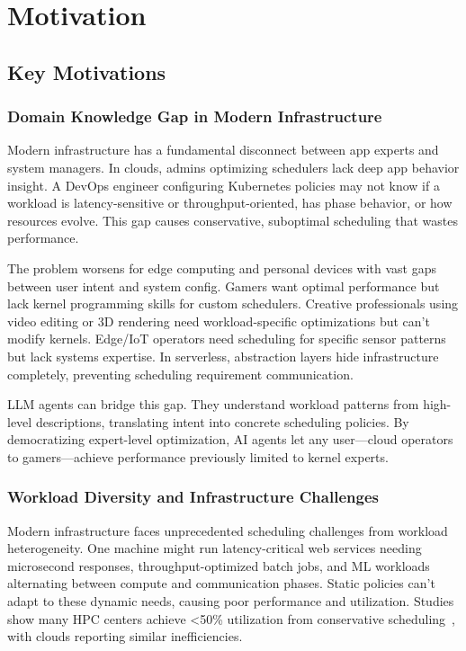 \section{Motivation}

\subsection{Key Motivations}

\subsubsection{Domain Knowledge Gap in Modern Infrastructure}

Modern infrastructure has a fundamental disconnect between app experts and system managers. In clouds, admins optimizing schedulers lack deep app behavior insight. A DevOps engineer configuring Kubernetes policies may not know if a workload is latency-sensitive or throughput-oriented, has phase behavior, or how resources evolve. This gap causes conservative, suboptimal scheduling that wastes performance.

The problem worsens for edge computing and personal devices with vast gaps between user intent and system config. Gamers want optimal performance but lack kernel programming skills for custom schedulers. Creative professionals using video editing or 3D rendering need workload-specific optimizations but can't modify kernels. Edge/IoT operators need scheduling for specific sensor patterns but lack systems expertise. In serverless, abstraction layers hide infrastructure completely, preventing scheduling requirement communication.

LLM agents can bridge this gap. They understand workload patterns from high-level descriptions, translating intent into concrete scheduling policies. By democratizing expert-level optimization, AI agents let any user—cloud operators to gamers—achieve performance previously limited to kernel experts.

\subsubsection{Workload Diversity and Infrastructure Challenges}

Modern infrastructure faces unprecedented scheduling challenges from workload heterogeneity. One machine might run latency-critical web services needing microsecond responses, throughput-optimized batch jobs, and ML workloads alternating between compute and communication phases. Static policies can't adapt to these dynamic needs, causing poor performance and utilization. Studies show many HPC centers achieve <50\% utilization from conservative scheduling~\cite{feitelson2023utilization}, with clouds reporting similar inefficiencies.

